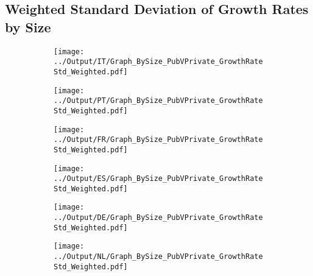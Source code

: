 \documentclass[12pt,notitlepage]{article}
\begin{document}
\subsection{Weighted Standard Deviation of Growth Rates by Size}
\begin{figure}[!htpb]
\centering
\begin{subfigure}{.49\textwidth}
    \centering
 \texttt{[image: ../Output/IT/Graph\_BySize\_PubVPrivate\_GrowthRateStd\_Weighted.pdf]}
\end{subfigure}%
\begin{subfigure}{.49\textwidth}
    \centering
 \texttt{[image: ../Output/PT/Graph\_BySize\_PubVPrivate\_GrowthRateStd\_Weighted.pdf]}
\end{subfigure}
\begin{subfigure}{.49\textwidth}
    \centering
 \texttt{[image: ../Output/FR/Graph\_BySize\_PubVPrivate\_GrowthRateStd\_Weighted.pdf]}
\end{subfigure}%
\begin{subfigure}{.49\textwidth}
    \centering
 \texttt{[image: ../Output/ES/Graph\_BySize\_PubVPrivate\_GrowthRateStd\_Weighted.pdf]}
\end{subfigure}
\begin{subfigure}{.49\textwidth}
    \centering
 \texttt{[image: ../Output/DE/Graph\_BySize\_PubVPrivate\_GrowthRateStd\_Weighted.pdf]}
\end{subfigure}
\begin{subfigure}{.49\textwidth}
    \centering
 \texttt{[image: ../Output/NL/Graph\_BySize\_PubVPrivate\_GrowthRateStd\_Weighted.pdf]}
\end{subfigure}
\end{figure}
\end{document}
